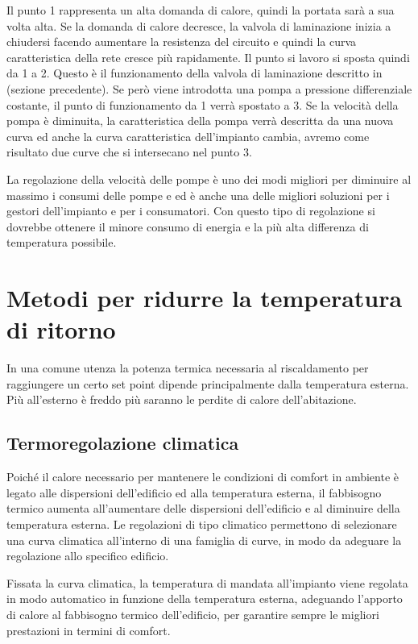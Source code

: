 \documentclass[laurea,oneside,11pt]{USiena_tesiLM}
\begin{document}

Il punto 1 rappresenta un alta domanda di calore, quindi la portata sarà a sua volta alta. Se la domanda di calore decresce, la valvola di laminazione inizia a chiudersi facendo aumentare la resistenza del circuito e quindi la curva caratteristica della rete cresce più rapidamente. Il punto si lavoro si sposta quindi da 1 a 2. Questo è il funzionamento della valvola di laminazione descritto in (sezione precedente). Se però viene introdotta una pompa a pressione differenziale costante, il punto di funzionamento da 1 verrà spostato a 3. Se la velocità della pompa è diminuita, la caratteristica della pompa verrà descritta da una nuova curva ed anche la curva caratteristica dell'impianto cambia, avremo come risultato due curve che si intersecano nel punto 3.      

La regolazione della velocità delle pompe è uno dei modi migliori per diminuire al massimo i consumi delle pompe e ed è anche una delle migliori soluzioni per i gestori dell'impianto e per i consumatori. Con questo tipo di regolazione si dovrebbe ottenere il minore consumo di energia e la più alta differenza di temperatura possibile.

\section{Metodi per ridurre la temperatura di ritorno}  
In una comune utenza la potenza termica necessaria al riscaldamento per raggiungere un certo set point dipende principalmente dalla temperatura esterna. Più all'esterno è freddo più saranno le perdite di calore dell'abitazione.


\subsection{Termoregolazione climatica}
Poiché il calore necessario per mantenere le condizioni di comfort in ambiente è legato alle dispersioni dell'edificio ed alla temperatura esterna, il fabbisogno termico aumenta all'aumentare delle dispersioni dell'edificio e al diminuire della temperatura esterna. Le regolazioni di tipo climatico permettono di selezionare una curva climatica all'interno di una famiglia di curve, in modo da adeguare la regolazione allo specifico edificio. 

Fissata la curva climatica, la temperatura di mandata all'impianto viene regolata in modo automatico in funzione della temperatura esterna, adeguando l'apporto di calore al fabbisogno termico dell'edificio, per garantire sempre le migliori prestazioni in termini di comfort. 
\end{document}
